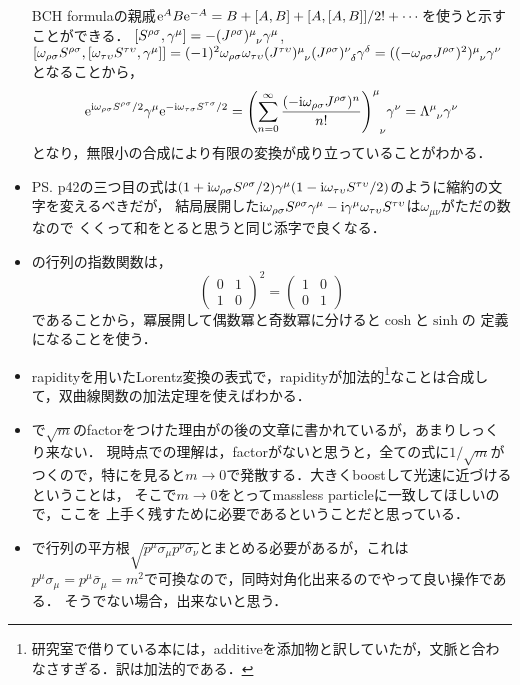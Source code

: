 \begin{itemize}
		BCH formulaの親戚$\mathrm{e}^{A}B\mathrm{e}^{-A} = B + [A, B] + [A, [A, B]]/2!  + \cdots$を使うと示すことができる．
		$[S^{\rho\sigma}, \gamma^{\mu}] = -(J^{\rho\sigma})\indices{^\mu_\nu}\gamma^{\mu}$, 
		$[\omega_{\rho\sigma}S^{\rho\sigma},[\omega_{\tau\upsilon}S^{\tau\upsilon}, \gamma^{\mu}]] \allowbreak = (-1)^2\omega_{\rho\sigma}\omega_{\tau\upsilon}(J^{\tau\upsilon})\indices{^\mu_\nu}(J^{\rho\sigma})\indices{^\nu_\delta}\gamma^{\delta} = ((-\omega_{\rho\sigma}J^{\rho\sigma})^2)\indices{^\mu_\nu}\gamma^{\nu}$
		となることから，
		\begin{equation}
			\e^{\i\omega_{\rho\sigma}S^{\rho\sigma}/2}\gamma^{\mu}\e^{-\i\omega_{\tau\sigma}S^{\tau\sigma}/2} = \qty(\sum_{n=0}^{\infty}\frac{(-\i\omega_{\rho\sigma }J^{\rho\sigma})^n}{n!})\indices{^\mu_\nu}\gamma^{\nu}
			= \Lambda\indices{^\mu_\nu}\gamma^{\nu}
		\end{equation}
		となり，無限小の合成により有限の変換が成り立っていることがわかる．
	\item PS. p42の三つ目の式は$(1+\mathrm{i}\omega_{\rho\sigma}S^{\rho\sigma}/2)\gamma^{\mu}(1-\mathrm{i}\omega_{\tau\upsilon}S^{\tau\upsilon}/2)$のように縮約の文字を変えるべきだが，
	結局展開した$\mathrm{i}\omega_{\rho\sigma}S^{\rho\sigma}\gamma^{\mu}-\mathrm{i}\gamma^{\mu}\omega_{\tau\upsilon}S^{\tau\upsilon}$は$\omega_{\mu\nu}$がただの数なので
	くくって和をとると思うと同じ添字で良くなる．
	\item {}の行列の指数関数は，
		\begin{equation}
			\begin{pmatrix}
				0 & 1\\
				1 & 0
			\end{pmatrix}^2 = 
			\begin{pmatrix}
				1 & 0\\
				0 &1
			\end{pmatrix}
		\end{equation}
		であることから，冪展開して偶数冪と奇数冪に分けると$\cosh$と$\sinh$の
		定義になることを使う．
	\item rapidityを用いたLorentz変換の表式で，rapidityが加法的\footnote{研究室で借りている本には，additiveを添加物と訳していたが，文脈と合わなさすぎる．訳は加法的である．}なことは合成して，双曲線関数の加法定理を使えばわかる．
	\item {}で$\sqrt{m}$のfactorをつけた理由がの後の文章に書かれているが，あまりしっくり来ない．
		現時点での理解は，factorがないと思うと，全ての式に$1/\sqrt{m}$がつくので，特にを見ると$m\to0$で発散する．大きくboostして光速に近づけるということは，
		そこで$m\to0$をとってmassless particleに一致してほしいので，ここを
		上手く残すために必要であるということだと思っている．
	\item {}で行列の平方根$\sqrt{p^{\mu}\sigma_{\mu} p^{\nu} \bar{\sigma}_{\nu}}$とまとめる必要があるが，これは$p^{\mu}\sigma_{\mu} = p^{\mu}\bar{\sigma}_{\mu}= m^2$で可換なので，同時対角化出来るのでやって良い操作である．
		そうでない場合，出来ないと思う．


\end{itemize}
